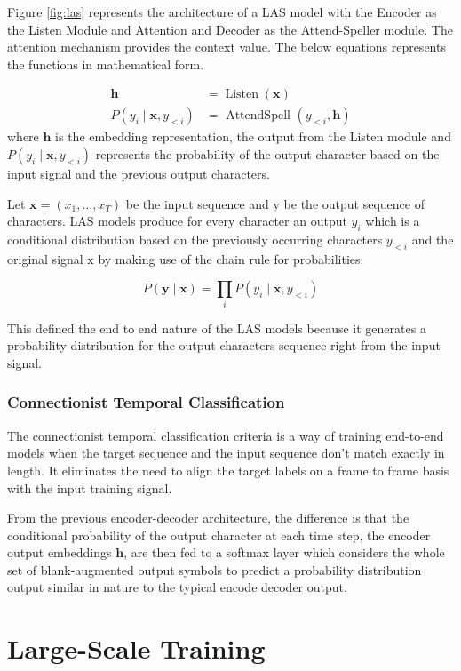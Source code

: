 Figure \ref{fig:las} represents the architecture of a LAS model with the Encoder as the Listen Module and Attention and Decoder as the Attend-Speller module. The attention mechanism provides the context value. The below equations represents the functions in mathematical form.

$$
\begin{aligned}
\mathbf{h} &=\operatorname{Listen}(\mathbf{x}) \\
P\left(y_{i} \mid \mathbf{x}, y_{<i}\right) &=\text { AttendSpell }\left(y_{<i}, \mathbf{h}\right)
\end{aligned}
$$
where $ \mathbf{h}$ is the embedding representation, the output from the Listen module and $P\left(y_{i} \mid \mathbf{x}, y_{<i}\right)$ represents the probability of the output character based on the input signal and the previous output characters.

Let $\mathbf{x}=\left(x_{1}, \ldots, x_{T}\right)$ be the input sequence and $\mathrm{y}$ be the output sequence of characters. LAS models produce for every character an output $y_{i}$ which is a conditional distribution based on the previously occurring characters $y_{<i}$ and the original signal $\mathrm{x}$ by making use of the chain rule for probabilities:

$$
P(\mathbf{y} \mid \mathbf{x})=\prod_{i} P\left(y_{i} \mid \mathbf{x}, y_{<i}\right)
$$

This defined the end to end nature of the LAS models because it generates a probability distribution for the output characters sequence right from the input signal. 

\subsubsection{Connectionist Temporal Classification}
The connectionist temporal classification criteria is a way of training end-to-end models when the target sequence and the input sequence don't match exactly in length. It eliminates the need to align the target labels on a frame to frame basis with the input training signal. 

From the previous encoder-decoder architecture, the difference is that the conditional probability of the output character at each time step, the encoder output embeddings $\mathbf{h}$, are then fed to a softmax layer which considers the whole set of blank-augmented output symbols to predict a probability distribution output similar in nature to the typical encode decoder output.

\section{Large-Scale Training}